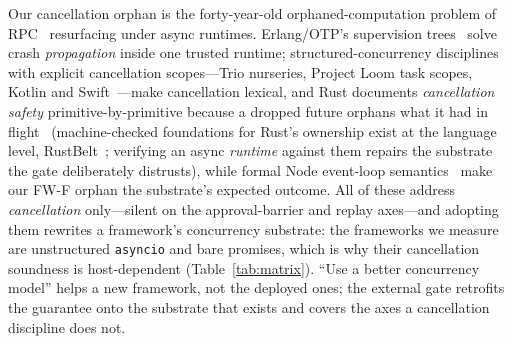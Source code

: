 \documentclass[10pt,journal,compsoc]{IEEEtran}
\begin{document}
Our cancellation orphan is the forty-year-old orphaned-computation problem of
RPC~\cite{birrell84} resurfacing under async runtimes. Erlang/OTP's supervision
trees~\cite{armstrong03} solve crash \emph{propagation} inside one trusted
runtime; structured-concurrency disciplines with explicit cancellation
scopes---Trio nurseries, Project Loom task scopes, Kotlin and
Swift~\cite{structconc}---make cancellation lexical, and Rust documents
\emph{cancellation safety} primitive-by-primitive because a dropped future
orphans what it had in flight~\cite{tokio-cancel} (machine-checked foundations
for Rust's ownership exist at the language level, RustBelt~\cite{rustbelt18};
verifying an async \emph{runtime} against them repairs the substrate the gate
deliberately distrusts), while formal Node event-loop
semantics~\cite{asyncjs17} make our \textsf{FW-F} orphan the substrate's
expected outcome. All of these address \emph{cancellation} only---silent on the approval-barrier and replay axes---and adopting them rewrites a framework's concurrency substrate: the frameworks we measure are unstructured \texttt{asyncio} and bare promises, which is why their cancellation soundness is host-dependent (Table~\ref{tab:matrix}). ``Use a better concurrency model''
helps a new framework, not the deployed ones; the external gate retrofits the
guarantee onto the substrate that exists and covers the axes a cancellation
discipline does not.
\end{document}
